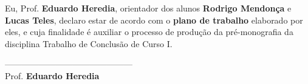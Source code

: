 \documentclass[12pt]{article}
\begin{document}
\noindent
Eu, Prof. \textbf{Eduardo Heredia}, orientador dos alunos \textbf{Rodrigo Mendonça}  e \textbf{Lucas Teles}, declaro estar de acordo com o \textbf{plano de trabalho} elaborado por eles, e cuja finalidade é auxiliar o processo de produção da pré-monografia da disciplina Trabalho de Conclusão de Curso I. 

\vspace{1.75cm}

\begin{center}
	
	---------------------------------------------\\
	Prof. \textbf{Eduardo Heredia}
\end{center}
\end{document}
